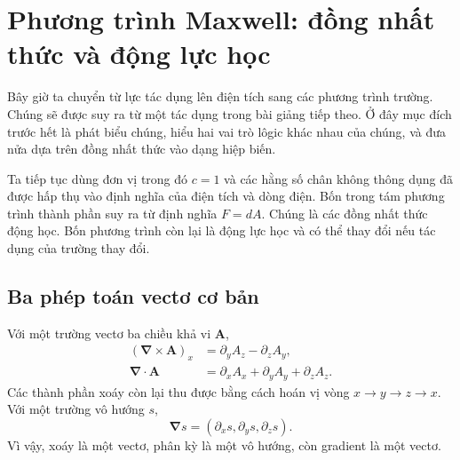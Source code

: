 \section{Phương trình Maxwell: đồng nhất thức và động lực học}

Bây giờ ta chuyển từ lực tác dụng lên điện tích sang các phương trình trường. Chúng sẽ được suy ra từ một tác dụng trong bài giảng tiếp theo. Ở đây mục đích trước hết là phát biểu chúng, hiểu hai vai trò lôgic khác nhau của chúng, và đưa nửa dựa trên đồng nhất thức vào dạng hiệp biến.

\begin{classroomqa}
\end{classroomqa}

\begin{classroomqa}
\end{classroomqa}

Ta tiếp tục dùng đơn vị trong đó \(c=1\) và các hằng số chân không thông dụng đã được hấp thụ vào định nghĩa của điện tích và dòng điện. Bốn trong tám phương trình thành phần suy ra từ định nghĩa \(F=dA\). Chúng là các đồng nhất thức động học. Bốn phương trình còn lại là động lực học và có thể thay đổi nếu tác dụng của trường thay đổi.

\subsection{Ba phép toán vectơ cơ bản}

Với một trường vectơ ba chiều khả vi \(\mathbf A\),
\begin{align}
(\boldsymbol\nabla\times\mathbf A)_x
&=
\partial_yA_z-\partial_zA_y,
\\
\boldsymbol\nabla\cdot\mathbf A
&=
\partial_xA_x+\partial_yA_y+\partial_zA_z.
\end{align}
Các thành phần xoáy còn lại thu được bằng cách hoán vị vòng \(x\to y\to z\to x\). Với một trường vô hướng \(s\),
\begin{equation}
\boldsymbol\nabla s
=
(\partial_xs,\partial_ys,\partial_zs).
\end{equation}
Vì vậy, xoáy là một vectơ, phân kỳ là một vô hướng, còn gradient là một vectơ.

